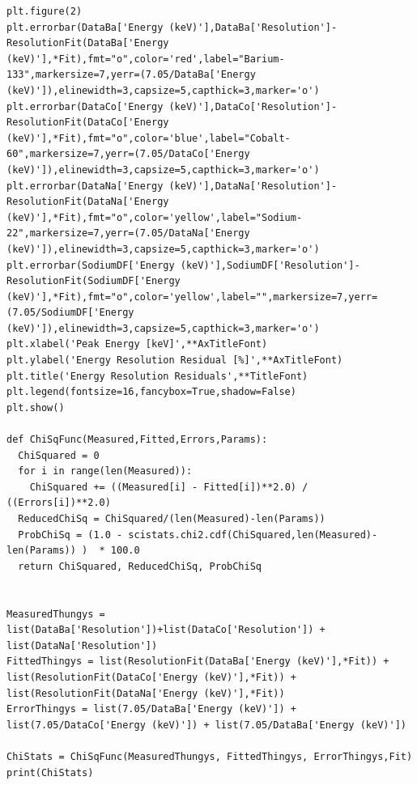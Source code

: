 \documentclass[11pt,a4paper]{article}
\begin{document}
\begin{verbatim}
plt.figure(2)
plt.errorbar(DataBa['Energy (keV)'],DataBa['Resolution']-ResolutionFit(DataBa['Energy (keV)'],*Fit),fmt="o",color='red',label="Barium-133",markersize=7,yerr=(7.05/DataBa['Energy (keV)']),elinewidth=3,capsize=5,capthick=3,marker='o')
plt.errorbar(DataCo['Energy (keV)'],DataCo['Resolution']-ResolutionFit(DataCo['Energy (keV)'],*Fit),fmt="o",color='blue',label="Cobalt-60",markersize=7,yerr=(7.05/DataCo['Energy (keV)']),elinewidth=3,capsize=5,capthick=3,marker='o')
plt.errorbar(DataNa['Energy (keV)'],DataNa['Resolution']-ResolutionFit(DataNa['Energy (keV)'],*Fit),fmt="o",color='yellow',label="Sodium-22",markersize=7,yerr=(7.05/DataNa['Energy (keV)']),elinewidth=3,capsize=5,capthick=3,marker='o')
plt.errorbar(SodiumDF['Energy (keV)'],SodiumDF['Resolution']-ResolutionFit(SodiumDF['Energy (keV)'],*Fit),fmt="o",color='yellow',label="",markersize=7,yerr=(7.05/SodiumDF['Energy (keV)']),elinewidth=3,capsize=5,capthick=3,marker='o')
plt.xlabel('Peak Energy [keV]',**AxTitleFont)
plt.ylabel('Energy Resolution Residual [%]',**AxTitleFont)
plt.title('Energy Resolution Residuals',**TitleFont)
plt.legend(fontsize=16,fancybox=True,shadow=False)
plt.show()

def ChiSqFunc(Measured,Fitted,Errors,Params):
  ChiSquared = 0
  for i in range(len(Measured)):
    ChiSquared += ((Measured[i] - Fitted[i])**2.0) / ((Errors[i])**2.0)
  ReducedChiSq = ChiSquared/(len(Measured)-len(Params))
  ProbChiSq = (1.0 - scistats.chi2.cdf(ChiSquared,len(Measured)-len(Params)) )  * 100.0
  return ChiSquared, ReducedChiSq, ProbChiSq


MeasuredThungys = list(DataBa['Resolution'])+list(DataCo['Resolution']) + list(DataNa['Resolution'])
FittedThingys = list(ResolutionFit(DataBa['Energy (keV)'],*Fit)) + list(ResolutionFit(DataCo['Energy (keV)'],*Fit)) + list(ResolutionFit(DataNa['Energy (keV)'],*Fit))
ErrorThingys = list(7.05/DataBa['Energy (keV)']) + list(7.05/DataCo['Energy (keV)']) + list(7.05/DataBa['Energy (keV)'])

ChiStats = ChiSqFunc(MeasuredThungys, FittedThingys, ErrorThingys,Fit)
print(ChiStats)
\end{verbatim}
\end{document}
